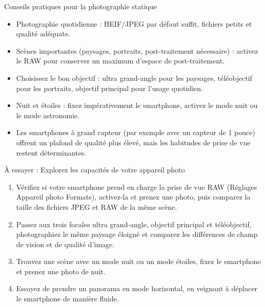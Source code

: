 \begin{tcbinfo}{Conseils pratiques pour la photographie statique}
\begin{itemize}
  \item Photographie quotidienne : HEIF/JPEG par défaut suffit, fichiers petits et qualité adéquate.
  \item Scènes importantes (paysages, portraits, post-traitement nécessaire) : activez le RAW pour conserver un maximum d'espace de post-traitement.
  \item Choisissez le bon objectif : ultra grand-angle pour les paysages, téléobjectif pour les portraits, objectif principal pour l'usage quotidien.
  \item Nuit et étoiles : fixez impérativement le smartphone, activez le mode nuit ou le mode astronomie.
  \item Les smartphones à grand capteur (par exemple avec un capteur de 1 pouce) offrent un plafond de qualité plus élevé, mais les habitudes de prise de vue restent déterminantes.
\end{itemize}

\end{tcbinfo}

\begin{tcbpractice}{À essayer : Explorez les capacités de votre appareil photo}
\begin{enumerate}
  \item Vérifiez si votre smartphone prend en charge la prise de vue RAW (Réglages Appareil photo Formats), activez-la et prenez une photo, puis comparez la taille des fichiers JPEG et RAW de la même scène.
  \item Passez aux trois focales ultra grand-angle, objectif principal et téléobjectif, photographiez le même paysage éloigné et comparez les différences de champ de vision et de qualité d'image.
  \item Trouvez une scène avec un mode nuit ou un mode étoiles, fixez le smartphone et prenez une photo de nuit.
  \item Essayez de prendre un panorama en mode horizontal, en veignant à déplacer le smartphone de manière fluide.
\end{enumerate}

\end{tcbpractice}

